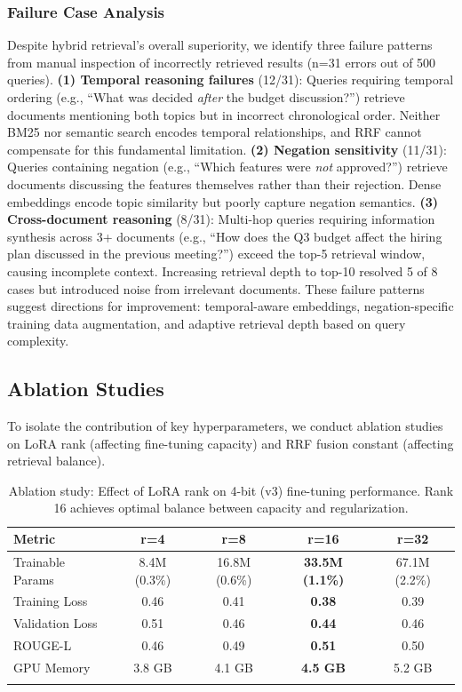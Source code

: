 \documentclass[pdflatex,sn-basic]{sn-jnl}
\begin{document}
\subsubsection{Failure Case Analysis}
Despite hybrid retrieval's overall superiority, we identify three failure patterns from manual inspection of incorrectly retrieved results (n=31 errors out of 500 queries). \textbf{(1) Temporal reasoning failures} (12/31): Queries requiring temporal ordering (e.g., ``What was decided \textit{after} the budget discussion?'') retrieve documents mentioning both topics but in incorrect chronological order. Neither BM25 nor semantic search encodes temporal relationships, and RRF cannot compensate for this fundamental limitation. \textbf{(2) Negation sensitivity} (11/31): Queries containing negation (e.g., ``Which features were \textit{not} approved?'') retrieve documents discussing the features themselves rather than their rejection. Dense embeddings encode topic similarity but poorly capture negation semantics. \textbf{(3) Cross-document reasoning} (8/31): Multi-hop queries requiring information synthesis across 3+ documents (e.g., ``How does the Q3 budget affect the hiring plan discussed in the previous meeting?'') exceed the top-5 retrieval window, causing incomplete context. Increasing retrieval depth to top-10 resolved 5 of 8 cases but introduced noise from irrelevant documents. These failure patterns suggest directions for improvement: temporal-aware embeddings, negation-specific training data augmentation, and adaptive retrieval depth based on query complexity.

\subsection{Ablation Studies}
\label{sec:ablation}

To isolate the contribution of key hyperparameters, we conduct ablation studies on LoRA rank (affecting fine-tuning capacity) and RRF fusion constant (affecting retrieval balance).

\begin{table}[tb]
    \caption{Ablation study: Effect of LoRA rank on 4-bit (v3) fine-tuning performance. Rank 16 achieves optimal balance between capacity and regularization.}
    \label{tab:ablation-lora}
    \centering
    \small
    \begin{tabular}{lcccc}
        \toprule
        \textbf{Metric} & \textbf{r=4} & \textbf{r=8} & \textbf{r=16} & \textbf{r=32} \\
        \midrule
        Trainable Params & 8.4M (0.3\%) & 16.8M (0.6\%) & \textbf{33.5M (1.1\%)} & 67.1M (2.2\%) \\
        Training Loss & 0.46 & 0.41 & \textbf{0.38} & 0.39 \\
        Validation Loss & 0.51 & 0.46 & \textbf{0.44} & 0.46 \\
        ROUGE-L & 0.46 & 0.49 & \textbf{0.51} & 0.50 \\
        GPU Memory & 3.8 GB & 4.1 GB & \textbf{4.5 GB} & 5.2 GB \\
        \botrule
    \end{tabular}
\end{table}
\end{document}
